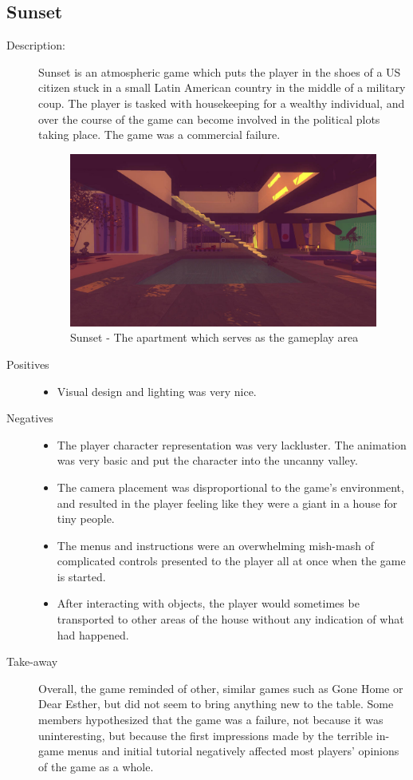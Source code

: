 


\clearpage
\subsection{Sunset}
\begin{description}
\item[Description:]{Sunset is an atmospheric game which puts the player in the shoes of a US citizen stuck in a small Latin American country in the middle of a military coup. The player is tasked with housekeeping for a wealthy individual, and over the course of the game can become involved in the political plots taking place. The game was a commercial failure.

\begin{figure}[htb]
	\centering\includegraphics[width=.25\linewidth]{images/game_sunset}
	\caption{Sunset - The apartment which serves as the gameplay area}
	\label{fig:sunset}
\end{figure}}

\item[Positives]{
\begin{itemize}
\item{Visual design and lighting was very nice.}
\end{itemize}}

\item[Negatives]{
\begin{itemize}
\item{The player character representation was very lackluster. The animation was very basic and put the character into the uncanny valley.}
\item{The camera placement was disproportional to the game's environment, and resulted in the player feeling like they were a giant in a house for tiny people.}
\item{The menus and instructions were an overwhelming mish-mash of complicated controls presented to the player all at once when the game is started.}
\item{After interacting with objects, the player would sometimes be transported to other areas of the house without any indication of what had happened.}
\end{itemize}}

\item[Take-away]{Overall, the game reminded \ourteam{} of other, similar games such as Gone Home or Dear Esther, but did not seem to bring anything new to the table. Some members hypothesized that the game was a failure, not because it was uninteresting, but because the first impressions made by the terrible in-game menus and initial tutorial negatively affected most players' opinions of the game as a whole.}
\end{description}



